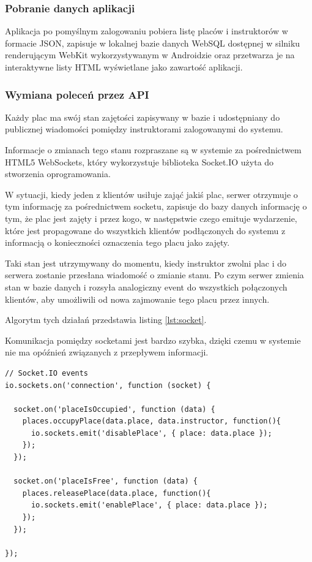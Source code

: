 \documentclass[twoside,a4paper,openright,12pt]{book}
\begin{document}
\subsubsection*{Pobranie danych aplikacji}
Aplikacja po pomyślnym zalogowaniu pobiera listę placów i instruktorów w formacie JSON, zapisuje w lokalnej bazie danych WebSQL dostępnej w silniku renderującym WebKit wykorzystywanym w Androidzie oraz przetwarza je na interaktywne listy HTML wyświetlane jako zawartość aplikacji.

\subsubsection*{Wymiana poleceń przez API}
Każdy plac ma swój stan zajętości zapisywany w bazie i udostępniany do publicznej wiadomości pomiędzy instruktorami zalogowanymi do systemu.

Informacje o zmianach tego stanu rozpraszane są w systemie za pośrednictwem HTML5 WebSockets, który wykorzystuje biblioteka Socket.IO użyta do stworzenia oprogramowania.

W sytuacji, kiedy jeden z klientów usiłuje zająć jakiś plac, serwer otrzymuje o tym informację za pośrednictwem socketu, zapisuje do bazy danych informację o tym, że plac jest zajęty i przez kogo, w następstwie czego emituje wydarzenie, które jest propagowane do wszystkich klientów podłączonych do systemu z informacją o konieczności oznaczenia tego placu jako zajęty.

Taki stan jest utrzymywany do momentu, kiedy instruktor zwolni plac i do serwera zostanie przesłana wiadomość o zmianie stanu. Po czym serwer zmienia stan w bazie danych i rozsyła analogiczny event do wszystkich połączonych klientów, aby umożliwili od nowa zajmowanie tego placu przez innych.

Algorytm tych działań przedstawia listing \ref{lst:socket}.

Komunikacja pomiędzy socketami jest bardzo szybka, dzięki czemu w systemie nie ma opóźnień związanych z przepływem informacji.


\begin{lstlisting}[frame=single,label={lst:socket},caption=Mechanizm obsługi socketów po stronie serwera]
// Socket.IO events
io.sockets.on('connection', function (socket) {

  socket.on('placeIsOccupied', function (data) {
    places.occupyPlace(data.place, data.instructor, function(){
      io.sockets.emit('disablePlace', { place: data.place });  
    });
  });

  socket.on('placeIsFree', function (data) {
    places.releasePlace(data.place, function(){
      io.sockets.emit('enablePlace', { place: data.place });  
    });
  });

});
\end{lstlisting}
\end{document}
